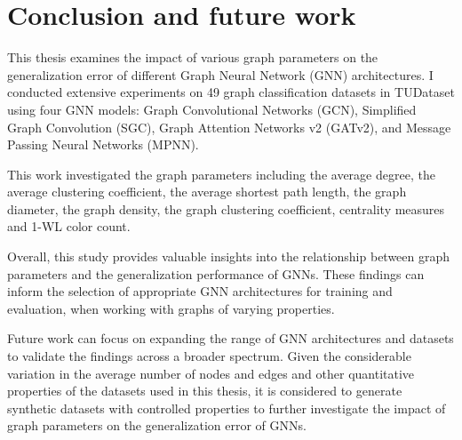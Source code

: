 \chapter{Conclusion and future work}\label{chap:conclusions}

This thesis examines the impact of various graph parameters on the generalization error of different Graph Neural Network (GNN) architectures. I conducted extensive experiments on 49 graph classification datasets in TUDataset using four GNN models: Graph Convolutional Networks (GCN), Simplified Graph Convolution (SGC), Graph Attention Networks v2 (GATv2), and Message Passing Neural Networks (MPNN).

This work investigated the graph parameters including the average degree, the average clustering coefficient, the average shortest path length, the graph diameter, the graph density, the graph clustering coefficient, centrality measures and 1-WL color count. 

Overall, this study provides valuable insights into the relationship between graph parameters and the generalization performance of GNNs. These findings can inform the selection of appropriate GNN architectures for training and evaluation, when working with graphs of varying properties.

Future work can focus on expanding the range of GNN architectures and datasets to validate the findings across a broader spectrum. Given the considerable variation in the average number of nodes and edges and other quantitative properties of the datasets used in this thesis, it is considered to generate synthetic datasets with controlled properties to further investigate the impact of graph parameters on the generalization error of GNNs.